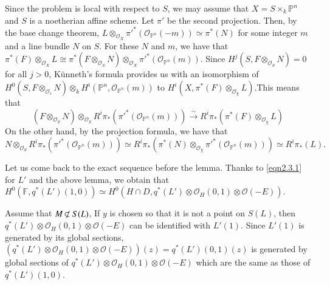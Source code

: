 \begin{Proof}
Since the problem is local with respect to $S$, we may assume that
$X=S\times_k\mathbb{P}^{n}$ and $S$ is a noetherian affine scheme. Let
$\pi'$ be the second projection. Then, by the base change theorem,
$L\otimes_{\mathscr{O}_{X}}{\pi'}^{\ast}(\mathscr{O}_{\mathbb{P}^{n}}(-m))\simeq
\pi^{\ast}(N)$ for some integer $m$ and a line bundle $N$ on $S$. For
these $N$ and $m$, we have that
$\pi^{\ast}(F)\otimes_{\mathscr{O}_{X}}L\cong
\pi^{\ast}(F\otimes_{\mathscr{O}_S}N)\otimes_{\mathscr{O}_{X}}{\pi'}^{*}(\mathscr{O}_{\mathbb{P}^{n}}(m))$. Since 
$H^{j}(S,F\otimes_{\mathscr{O}_{S}}N)=0$ for all $j>0$,
K\"{u}nneth's formula provides us with an isomorphism of
$H^{0}(S,F\otimes_{\mathscr{O}_{s}}N)\otimes_k
H^{i}(\mathbb{P}^{n},\mathscr{O}_{\mathbb{P}^{n}}(m))$ to
$H^{i}(X,\pi^{\ast}(F)\otimes_{\mathscr{O}_{\chi }}L)$.\pageoriginale This
means that
$$
(F\otimes_{\mathscr{O}_{S}}N)\otimes_{\mathscr{O}_{S}}R^{i}\pi_{\ast}({\pi'}^{\ast}(\mathscr{O}_{\mathbb{P}^{n}}(m)))\xrightarrow{\sim}R^{i}\pi_{\ast}(\pi^{\ast}(F)\otimes
_{\mathscr{O}_{\chi }}L)
$$
On the other hand, by the projection formula, we have that
$$
N\otimes_{\mathscr{O}_{S}}R^{i}\pi_{\ast}({\pi'}^{\ast}(\mathscr{O}_{\mathbb{P}^{n}}(m)))\simeq
R^{i}\pi_{\ast}(\pi^{\ast}(N)\otimes_{\mathscr{O}_{\chi }}{\pi'}^{\ast}(\mathscr{O}_{\mathbb{P}^{n}}(m)))\simeq
R^{i}\pi_{\ast}(L).
$$ 
\enprf
\end{Proof}

Let us come back to the exact sequence before the lemma. Thanks to
\eqref{eqn2.3.1} for $L'$ and the above lemma, we obtain that
$H^{0}(\mathbb{F},q^{\ast}(L')(1,0))\simeq H^{0}(H\cap D,
q^{\ast}(L')\otimes \mathscr{O}_{H}(0,1)\otimes \mathscr{O}(-E))$.

\begin{case}%
Assume that $M\not\kern-1pt\subset S(L)$, If $y$ is chosen so that it is not a
point on $S(L)$, then $q^{\ast}(L')\otimes\mathscr{O}_{H}(0,1)\otimes
\mathscr{O}(-E)$ can be identified with $L'(1)$. Since $L'(1)$ is
generated by its global sections, $(q^{\ast}(L')\otimes
\mathscr{O}_{H}(0,1)\otimes \mathscr{O}(-E))(z)=q^{\ast}(L')(0,1)(z)$
is generated by global sections of $q^{\ast}(L')\otimes
\mathscr{O}_{H}(0,1)\otimes \mathscr{O}(-E)$ which are the same as
those of $q^{\ast}(L')(1,0)$.
\end{case}

